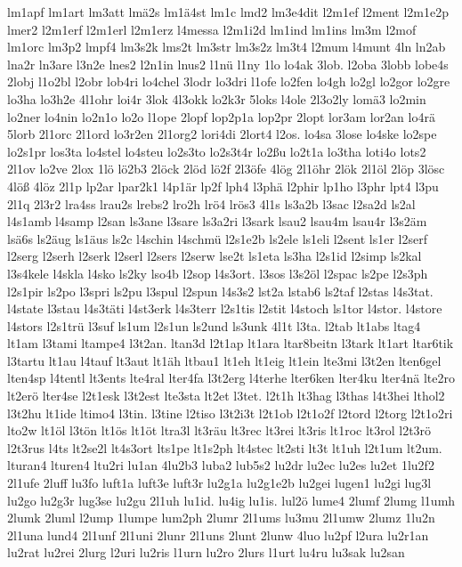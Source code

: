 {lm1apf
lm1art
lm3att
lmä2s
lm1ä4st
lm1c
lmd2
lm3e4dit
l2m1ef
l2ment
l2m1e2p
lmer2
l2m1erf
l2m1erl
l2m1erz
l4messa
l2m1i2d
lm1ind
lm1ins
lm3m
l2mof
lm1orc
lm3p2
lmpf4
lm3s2k
lms2t
lm3str
lm3s2z
lm3t4
l2mum
l4munt
4ln
ln2ab
lna2r
ln3are
l3n2e
lnes2
l2n1in
lnus2
l1nü
l1ny
1lo
lo4ak
3lob.
l2oba
3lobb
lobe4s
2lobj
l1o2bl
l2obr
lob4ri
lo4chel
3lodr
lo3dri
l1ofe
lo2fen
lo4gh
lo2gl
lo2gor
lo2gre
lo3ha
lo3h2e
4l1ohr
loi4r
3lok
4l3okk
lo2k3r
5loks
l4ole
2l3o2ly
lomä3
lo2min
lo2ner
lo4nin
lo2n1o
lo2o
l1ope
2lopf
lop2p1a
lop2pr
2lopt
lor3am
lor2an
lo4rä
5lorb
2l1orc
2l1ord
lo3r2en
2l1org2
lori4di
2lort4
l2os.
lo4sa
3lose
lo4ske
lo2spe
lo2s1pr
los3ta
lo4stel
lo4steu
lo2s3to
lo2s3t4r
lo2ßu
lo2t1a
lo3tha
loti4o
lots2
2l1ov
lo2ve
2lox
1lö
lö2b3
2löck
2löd
lö2f
2l3öfe
4lög
2l1öhr
2lök
2l1öl
2löp
3lösc
4löß
4löz
2l1p
lp2ar
lpar2k1
l4p1är
lp2f
lph4
l3phä
l2phir
lp1ho
l3phr
lpt4
l3pu
2l1q
2l3r2
lra4ss
lrau2s
lrebs2
lro2h
lrö4
lrös3
4l1s
ls3a2b
l3sac
l2sa2d
ls2al
l4s1amb
l4samp
l2san
ls3ane
l3sare
ls3a2ri
l3sark
lsau2
lsau4m
lsau4r
l3s2äm
lsä6s
ls2äug
ls1äus
ls2c
l4schin
l4schmü
l2s1e2b
ls2ele
ls1eli
l2sent
ls1er
l2serf
l2serg
l2serh
l2serk
l2serl
l2sers
l2serw
lse2t
ls1eta
ls3ha
l2s1id
l2simp
ls2kal
l3s4kele
l4skla
l4sko
ls2ky
lso4b
l2sop
l4s3ort.
l3sos
l3s2öl
l2spac
ls2pe
l2s3ph
l2s1pir
ls2po
l3spri
ls2pu
l3spul
l2spun
l4s3s2
lst2a
lstab6
ls2taf
l2stas
l4s3tat.
l4state
l3stau
l4s3täti
l4st3erk
l4s3terr
l2s1tis
l2stit
l4stoch
ls1tor
l4stor.
l4store
l4stors
l2s1trü
l3suf
ls1um
l2s1un
ls2und
ls3unk
4l1t
l3ta.
l2tab
lt1abs
ltag4
lt1am
l3tami
ltampe4
l3t2an.
ltan3d
l2t1ap
lt1ara
ltar8beitn
l3tark
lt1art
ltar6tik
l3tartu
lt1au
l4tauf
lt3aut
lt1äh
ltbau1
lt1eh
lt1eig
lt1ein
lte3mi
l3t2en
lten6gel
lten4sp
l4tentl
lt3ents
lte4ral
lter4fa
l3t2erg
l4terhe
lter6ken
lter4ku
lter4nä
lte2ro
lt2erö
lter4se
l2t1esk
l3t2est
lte3sta
lt2et
l3tet.
l2t1h
lt3hag
l3thas
l4t3hei
lthol2
l3t2hu
lt1ide
ltimo4
l3tin.
l3tine
l2tiso
l3t2i3t
l2t1ob
l2t1o2f
l2tord
l2torg
l2t1o2ri
lto2w
lt1öl
l3tön
lt1ös
lt1öt
ltra3l
lt3räu
lt3rec
lt3rei
lt3ris
lt1roc
lt3rol
l2t3rö
l2t3rus
l4ts
lt2se2l
lt4s3ort
lts1pe
lt1s2ph
lt4stec
lt2sti
lt3t
lt1uh
l2t1um
lt2um.
lturan4
lturen4
ltu2ri
lu1an
4lu2b3
luba2
lub5s2
lu2dr
lu2ec
lu2es
lu2et
1lu2f2
2l1ufe
2luff
lu3fo
luft1a
luft3e
luft3r
lu2g1a
lu2g1e2b
lu2gei
lugen1
lu2gi
lug3l
lu2go
lu2g3r
lug3se
lu2gu
2l1uh
lu1id.
lu4ig
lu1is.
lul2ö
lume4
2lumf
2lumg
l1umh
2lumk
2luml
l2ump
1lumpe
lum2ph
2lumr
2l1ums
lu3mu
2l1umw
2lumz
1lu2n
2l1una
lund4
2l1unf
2l1uni
2lunr
2l1uns
2lunt
2lunw
4luo
lu2pf
l2ura
lu2r1an
lu2rat
lu2rei
2lurg
l2uri
lu2ris
l1urn
lu2ro
2lurs
l1urt
lu4ru
lu3sak
lu2san
}
